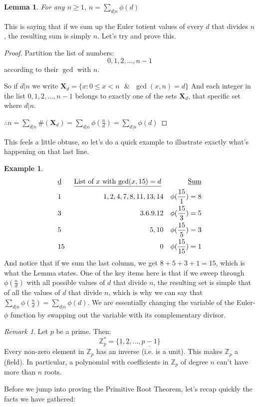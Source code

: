 \documentclass[10pt]{article}
\newcommand{\Z}{\mathbb{Z}}
\newtheorem{lemma}[theorem]{Lemma}
\theoremstyle{definition}
\newtheorem{ex}[theorem]{Example}
\theoremstyle{remark}
\newtheorem{remark}[theorem]{Remark}
\def\Z{\mathbb{ Z}}
\def\ul{\underline}
\newcommand{\mb}[1]{\mathbf{#1}}
\begin{document}
\begin{lemma}
For any $n \geq 1$, $n=\sum_{d|n}\phi(d)$
\end{lemma}
This is saying that if we sum up the Euler totient values of every $d$ that divides $n$, the resulting sum is simply $n$. Let's try and prove this.
\begin{proof}
Partition the list of numbers: $$0,1,2,\ldots , n-1$$ according to their $\gcd$ with $n$.

So if $d|n$ we write $\mb{X}_d = \{x:0 \leq x < n \text{ $\&$ } \gcd(x,n)=d\}$
And each integer in the list $0,1,2,\ldots , n-1$ belongs to exactly one of the sets $\mb{X}_d$, that specific set where $d|n$.

$\therefore n =\sum_{d|n}\#(\mb{X}_d) = \sum_{d|n}\phi(\frac{n}{d}) = \sum_{d|n}\phi(d)$
\end{proof}
This feels a little obtuse, so let's do a quick example to illustrate exactly what's happening on that last line.
\begin{ex}
\begin{align*}
&\text{\underline{d}  }&\text{ \underline{List of $x$ with $\gcd(x,15)=d$} } && \text{\underline{Sum}}\\
&1 & 1,2,4,7,8,11,13,14 && \phi(\frac{15}{1}) = 8\\
&3 & 3.6.9.12 && \phi(\frac{15}{3}) = 5\\
&5 & 5,10 && \phi(\frac{15}{5}) = 3\\
&15 & 0 && \phi(\frac{15}{15}) = 1
\end{align*}
And notice that if we sum the last column, we get $8 + 5 + 3 + 1 = 15$, which is what the Lemma states.  One of the key items here is that if we sweep through $\phi(\frac{n}{d})$ with all possible values of $d$ that divide $n$, the resulting set is simple that of all the values of $d$ that divide $n$, which is why we can say that $\sum_{d|n}\phi(\frac{n}{d}) = \sum_{d|n}\phi(d)$.  We are essentially changing the variable of the Euler-$\phi$ function by swapping out the variable with its complementary divisor.
\end{ex}
\begin{remark}
Let $p$ be a prime.  Then: $$\Z_{p}^* = \{\ul{1},\ul{2},\ldots ,\ul{p-1}\}$$
Every non-zero element in $\Z_{p}$ has an inverse (i.e. is a unit).  This makes $\Z_{p}$ a \ul(field).  In particular, a polynomial with coefficients in $\Z_{p}$ of degree $n$ can't have more than $n$ roots.
\end{remark}
Before we jump into proving the Primitive Root Theorem, let's recap quickly the facts we have gathered:
\end{document}
